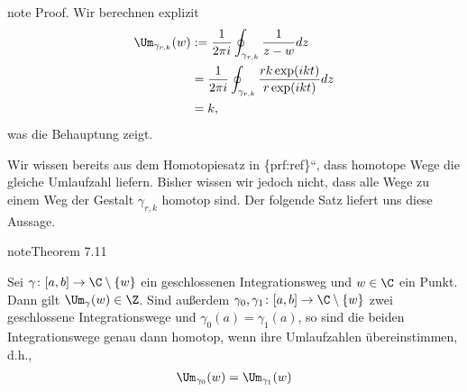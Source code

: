 \documentclass[letterpaper,10pt,german]{jupyterBook}
\begin{document}
\begin{sphinxadmonition}{note}
\sphinxAtStartPar
Proof. Wir berechnen explizit
\begin{equation*}
\begin{split}\Um_{\gamma_{r,k}}(w) &:= 
\frac{1}{2\pi i} \oint_{\gamma_{r,k}} \frac{1}{z - w} dz\\ 
&=
\frac{1}{2\pi i} \oint_{\gamma_{r,k}} \frac{r k \exp(ikt)}{r \exp(ikt)} dz\\
&= k,\end{split}
\end{equation*}
\sphinxAtStartPar
was die Behauptung zeigt.
\end{sphinxadmonition}

\sphinxAtStartPar
{}

\sphinxAtStartPar
Wir wissen bereits aus dem Homotopiesatz in \{prf:ref\}``, dass homotope Wege die gleiche Umlaufzahl liefern.
Bisher wissen wir jedoch nicht, dass alle Wege zu einem Weg der Gestalt \(\gamma_{r,k}\) homotop sind.
Der folgende Satz liefert uns diese Aussage.
\label{complexanalysis/residuensatz:theorem-10}
\begin{sphinxadmonition}{note}{Theorem 7.11}



\sphinxAtStartPar
Sei \(\gamma \colon [a,b] \rightarrow \C \setminus \{w\}\) ein geschlossenen Integrationsweg und \(w \in \C\) ein Punkt.
Dann gilt \(\Um_\gamma(w) \in \Z\).
Sind außerdem \(\gamma_0, \gamma_1 \colon [a,b] \rightarrow \C \setminus \{w\}\) zwei geschlossene Integrationswege und \(\gamma_0(a) = \gamma_1(a)\), so sind die beiden Integrationswege genau dann homotop, wenn ihre Umlaufzahlen übereinstimmen, d.h.,
\begin{equation*}
\begin{split}\Um_{\gamma_0}(w) = \Um_{\gamma_1}(w)\end{split}
\end{equation*}\end{sphinxadmonition}
\end{document}
